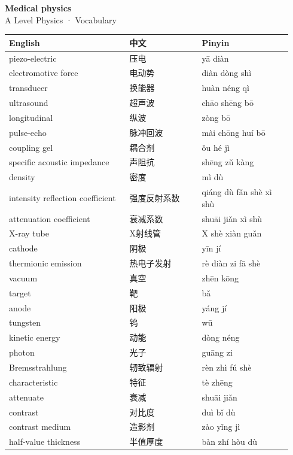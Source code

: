\documentclass[11pt]{article}
\begin{document}
\begin{center}
  {\LARGE\bfseries Medical physics}\\[0.35em]
  {\large A Level Physics · Vocabulary}
\end{center}
\vspace{0.6em}

\begin{longtable}{@{}p{0.40\linewidth}p{0.24\linewidth}p{0.30\linewidth}@{}}
\toprule
\textbf{English} & \textbf{中文} & \textbf{Pinyin} \\
\midrule
\endhead
\bottomrule
\endlastfoot
piezo-electric & 压电 & yā diàn \\
electromotive force & 电动势 & diàn dòng shì \\
transducer & 换能器 & huàn néng qì \\
ultrasound & 超声波 & chāo shēng bō \\
longitudinal & 纵波 & zòng bō \\
pulse-echo & 脉冲回波 & mài chōng huí bō \\
coupling gel & 耦合剂 & ǒu hé jì \\
specific acoustic impedance & 声阻抗 & shēng zǔ kàng \\
density & 密度 & mì dù \\
intensity reflection coefficient & 强度反射系数 & qiáng dù fǎn shè xì shù \\
attenuation coefficient & 衰减系数 & shuāi jiǎn xì shù \\
X-ray tube & X射线管 & X shè xiàn guǎn \\
cathode & 阴极 & yīn jí \\
thermionic emission & 热电子发射 & rè diàn zi fā shè \\
vacuum & 真空 & zhēn kōng \\
target & 靶 & bǎ \\
anode & 阳极 & yáng jí \\
tungsten & 钨 & wū \\
kinetic energy & 动能 & dòng néng \\
photon & 光子 & guāng zi \\
Bremsstrahlung & 轫致辐射 & rèn zhì fú shè \\
characteristic & 特征 & tè zhēng \\
attenuate & 衰减 & shuāi jiǎn \\
contrast & 对比度 & duì bǐ dù \\
contrast medium & 造影剂 & zào yǐng jì \\
half-value thickness & 半值厚度 & bàn zhí hòu dù \\

\end{longtable}
\end{document}
